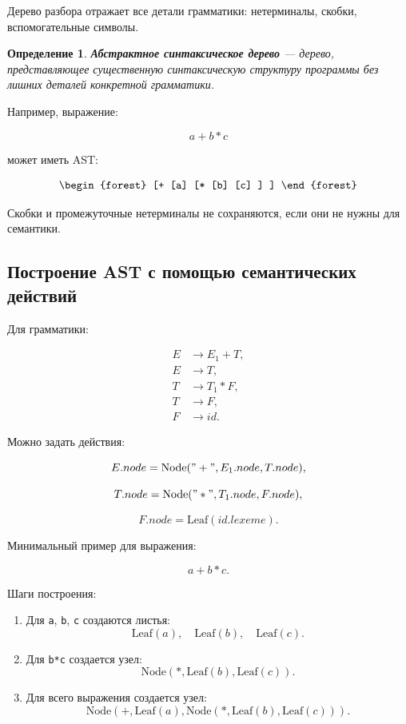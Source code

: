 \documentclass[12pt,a4paper]{article}
\newtheorem{definition}{Определение}
\begin{document}
Дерево разбора отражает все детали грамматики: нетерминалы, скобки, вспомогательные символы.

\begin{definition}
\textbf{Абстрактное синтаксическое дерево} --- дерево, представляющее существенную синтаксическую структуру программы без лишних деталей конкретной грамматики.
\end{definition}

Например, выражение:

\[
a + b * c
\]

может иметь AST:

\[
\begin{forest}
[+
  [a]
  [*
    [b]
    [c]
  ]
]
\end{forest}
\]

Скобки и промежуточные нетерминалы не сохраняются, если они не нужны для семантики.

\subsection{Построение AST с помощью семантических действий}

Для грамматики:

\[
\begin{aligned}
E &\to E_1 + T,\\
E &\to T,\\
T &\to T_1 * F,\\
T &\to F,\\
F &\to id.
\end{aligned}
\]

Можно задать действия:

\[
E.node = \mathrm{Node}("+", E_1.node, T.node),
\]

\[
T.node = \mathrm{Node}("*", T_1.node, F.node),
\]

\[
F.node = \mathrm{Leaf}(id.lexeme).
\]

Минимальный пример для выражения:

\[
a+b*c.
\]

Шаги построения:

\begin{enumerate}
    \item Для \texttt{a}, \texttt{b}, \texttt{c} создаются листья:
    \[
    \mathrm{Leaf}(a),\quad \mathrm{Leaf}(b),\quad \mathrm{Leaf}(c).
    \]
    \item Для \texttt{b*c} создается узел:
    \[
    \mathrm{Node}(*,\mathrm{Leaf}(b),\mathrm{Leaf}(c)).
    \]
    \item Для всего выражения создается узел:
    \[
    \mathrm{Node}(+,\mathrm{Leaf}(a),\mathrm{Node}(*,\mathrm{Leaf}(b),\mathrm{Leaf}(c))).
    \]
\end{enumerate}
\end{document}
